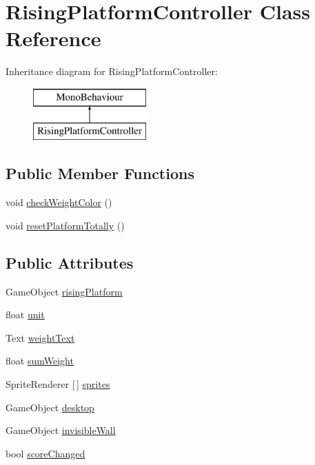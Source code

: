 \hypertarget{class_rising_platform_controller}{}\section{Rising\+Platform\+Controller Class Reference}
\label{class_rising_platform_controller}
Inheritance diagram for Rising\+Platform\+Controller\+:\begin{figure}[H]
\begin{center}
\leavevmode
\includegraphics[height=2.000000cm]{class_rising_platform_controller}
\end{center}
\end{figure}
\subsection*{Public Member Functions}
\begin{DoxyCompactItemize}
\item 
void \hyperlink{class_rising_platform_controller_a469cee8bbb405ae5915d5e9096fa674b}{check\+Weight\+Color} ()
\item 
void \hyperlink{class_rising_platform_controller_a522fc81dfd4bb686de380fb5fa0c5535}{reset\+Platform\+Totally} ()
\end{DoxyCompactItemize}
\subsection*{Public Attributes}
\begin{DoxyCompactItemize}
\item 
Game\+Object \hyperlink{class_rising_platform_controller_aee1892eb7e64522025a2d1e1e254559e}{rising\+Platform}
\item 
float \hyperlink{class_rising_platform_controller_a0893b61a3a698787d4a69609b2e54db8}{unit}
\item 
Text \hyperlink{class_rising_platform_controller_ab5c78cdbb1ecc9e4ea72493e0013196e}{weight\+Text}
\item 
float \hyperlink{class_rising_platform_controller_ae48d2737933574ae34b2eea2cff87be7}{sum\+Weight}
\item 
Sprite\+Renderer \mbox{[}$\,$\mbox{]} \hyperlink{class_rising_platform_controller_a56c49369542b88f9d2a1eaa7624786cf}{sprites}
\item 
Game\+Object \hyperlink{class_rising_platform_controller_ade27e9e3be7bc58e746e0d5ba1461747}{desktop}
\item 
Game\+Object \hyperlink{class_rising_platform_controller_aa15f6065f1dc6e86bfc34be46b636621}{invisible\+Wall}
\item 
bool \hyperlink{class_rising_platform_controller_abb132a32dd02ba1e7f2bb020489c5911}{score\+Changed}
\end{DoxyCompactItemize}


